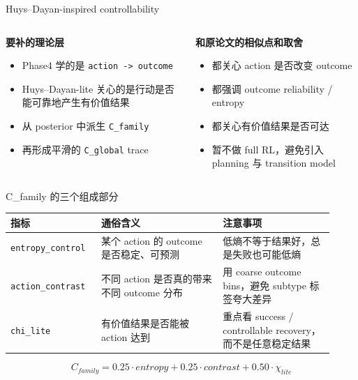 \documentclass[aspectratio=169]{beamer}
\begin{document}
\begin{frame}[t]{Huys--Dayan-inspired controllability}
\small
\begin{columns}[T]
\begin{column}{0.50\textwidth}
\textbf{要补的理论层}
\begin{itemize}
    \item Phase4 学的是 \texttt{action -> outcome}
    \item Huys--Dayan-lite 关心的是行动是否能可靠地产生有价值结果
    \item 从 posterior 中派生 \texttt{C\_family}
    \item 再形成平滑的 \texttt{C\_global} trace
\end{itemize}
\end{column}

\begin{column}{0.46\textwidth}
\textbf{和原论文的相似点和取舍}
\begin{itemize}
    \item 都关心 action 是否改变 outcome
    \item 都强调 outcome reliability / entropy
    \item 都关心有价值结果是否可达
    \item 暂不做 full RL，避免引入 planning 与 transition model
\end{itemize}
\end{column}
\end{columns}
\end{frame}

\begin{frame}[t]{C\_family 的三个组成部分}
\small
\renewcommand{\arraystretch}{1.16}
\begin{tabular}{@{}L{0.25\linewidth}L{0.35\linewidth}L{0.32\linewidth}@{}}
\toprule
指标 & 通俗含义 & 注意事项 \\
\midrule
\texttt{entropy\_control} & 某个 action 的 outcome 是否稳定、可预测 & 低熵不等于结果好，总是失败也可能低熵 \\
\texttt{action\_contrast} & 不同 action 是否真的带来不同 outcome 分布 & 用 coarse outcome bins，避免 subtype 标签夸大差异 \\
\texttt{chi\_lite} & 有价值结果是否能被 action 达到 & 重点看 success / controllable recovery，而不是任意稳定结果 \\
\bottomrule
\end{tabular}

\vspace{0.35cm}
\[
C_{family}=0.25\cdot entropy + 0.25\cdot contrast + 0.50\cdot \chi_{lite}
\]

\end{frame}
\end{document}
